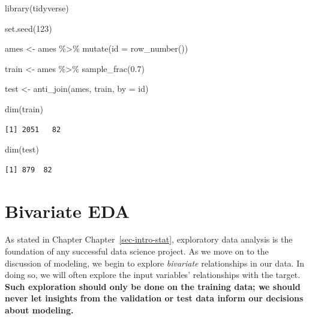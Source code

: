 \documentclass[
  letterpaper,
  DIV=11,
  numbers=noendperiod]{scrreprt}
\newenvironment{Shaded}{\begin{snugshade}}{\end{snugshade}}
\newcommand{\AttributeTok}[1]{\textcolor[rgb]{0.40,0.45,0.13}{#1}}
\newcommand{\DecValTok}[1]{\textcolor[rgb]{0.68,0.00,0.00}{#1}}
\newcommand{\FloatTok}[1]{\textcolor[rgb]{0.68,0.00,0.00}{#1}}
\newcommand{\FunctionTok}[1]{\textcolor[rgb]{0.28,0.35,0.67}{#1}}
\newcommand{\NormalTok}[1]{\textcolor[rgb]{0.00,0.23,0.31}{#1}}
\newcommand{\OtherTok}[1]{\textcolor[rgb]{0.00,0.23,0.31}{#1}}
\newcommand{\SpecialCharTok}[1]{\textcolor[rgb]{0.37,0.37,0.37}{#1}}
\newcommand{\StringTok}[1]{\textcolor[rgb]{0.13,0.47,0.30}{#1}}
\begin{document}
\begin{Shaded}
\begin{Highlighting}[]
\FunctionTok{library}\NormalTok{(tidyverse)}

\FunctionTok{set.seed}\NormalTok{(}\DecValTok{123}\NormalTok{)}

\NormalTok{ames }\OtherTok{\textless{}{-}}\NormalTok{ ames }\SpecialCharTok{\%\textgreater{}\%} \FunctionTok{mutate}\NormalTok{(}\AttributeTok{id =} \FunctionTok{row\_number}\NormalTok{())}

\NormalTok{train }\OtherTok{\textless{}{-}}\NormalTok{ ames }\SpecialCharTok{\%\textgreater{}\%} \FunctionTok{sample\_frac}\NormalTok{(}\FloatTok{0.7}\NormalTok{)}

\NormalTok{test }\OtherTok{\textless{}{-}} \FunctionTok{anti\_join}\NormalTok{(ames, train, }\AttributeTok{by =} \StringTok{\textquotesingle{}id\textquotesingle{}}\NormalTok{)}

\FunctionTok{dim}\NormalTok{(train)}
\end{Highlighting}
\end{Shaded}

\begin{verbatim}
[1] 2051   82
\end{verbatim}

\begin{Shaded}
\begin{Highlighting}[]
\FunctionTok{dim}\NormalTok{(test)}
\end{Highlighting}
\end{Shaded}

\begin{verbatim}
[1] 879  82
\end{verbatim}

\hypertarget{bivariate-eda}{%
\section{Bivariate EDA}\label{bivariate-eda}}

As stated in Chapter Chapter~\ref{sec-intro-stat}, exploratory data
analysis is the foundation of any successful data science project. As we
move on to the discussion of modeling, we begin to explore
\emph{bivariate} relationships in our data. In doing so, we will often
explore the input variables' relationships with the target. \textbf{Such
exploration should only be done on the training data; we should never
let insights from the validation or test data inform our decisions about
modeling.}
\end{document}
